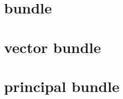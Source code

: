 \documentclass[dvipdfmx]{jsarticle}
\begin{document}
\section{bundle}


\section{vector bundle}


\section{principal bundle}

\end{document}
